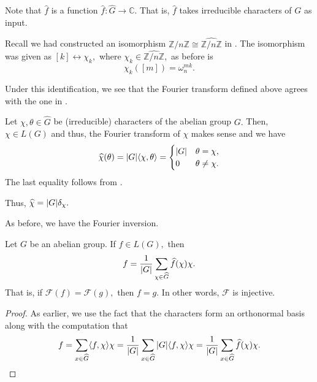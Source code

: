 Note that $\widehat{f}$ is a function $\widehat{f} : \widehat{G} \to \mathbb{C}.$ That is, $\widehat{f}$ takes irreducible characters of $G$ as input.

\begin{rem}
    Recall we had constructed an isomorphism $\mathbb{Z}/n\mathbb{Z} \cong \widehat{\mathbb{Z}/n\mathbb{Z}}$ in . The isomorphism was given as $[k] \leftrightarrow \chi_k,$ where $\chi_k \in \widehat{\mathbb{Z}/n\mathbb{Z}},$ as before is
    \begin{equation*} 
        \chi_k([m]) = \omega_n^{mk}.
    \end{equation*}

    Under this identification, we see that the Fourier transform defined above agrees with the one in .
\end{rem}

\begin{ex} \label{ex:fourtranschar}
    Let $\chi, \theta \in \widehat{G}$ be (irreducible) characters of the abelian group $G.$ Then, $\chi \in L(G)$ and thus, the Fourier transform of $\chi$ makes sense and we have
    \begin{equation*}
        \widehat{\chi}(\theta) = {\left\lvert G \right\lvert} \langle \chi, \theta\rangle = 
        \begin{cases}
            {\left\lvert G \right\lvert} & \theta = \chi, \\
            0 & \theta \neq \chi.
        \end{cases}
    \end{equation*}
    The last equality follows from .
    
    Thus, $\widehat{\chi} = {\left\lvert G \right\lvert} \delta_\chi.$
\end{ex}

As before, we have the Fourier inversion. 

\begin{thm} \label{thm:fourierinv}
    Let $G$ be an abelian group. If $f \in L(G),$ then
    \begin{equation*}
        f = \frac{1}{{\left\lvert G \right\lvert}}\sum_{\chi \in \widehat{G}} \widehat{f}(\chi)\chi.
    \end{equation*}
    That is, if $\mathcal{F}(f) = \mathcal{F}(g),$ then $f = g.$ In other words, $\mathcal{F}$ is injective.
\end{thm}
\begin{proof}
    As earlier, we use the fact that the characters form an orthonormal basis along with the computation that
    \begin{equation*}
        f = \sum_{x \in \widehat{G}}\langle f, \chi\rangle\chi = \frac{1}{{\left\lvert G \right\lvert}}\sum_{x \in \widehat{G}}{\left\lvert G \right\lvert}\langle f, \chi\rangle\chi = \frac{1}{{\left\lvert G \right\lvert}}\sum_{x \in \widehat{G}} \widehat{f}(\chi)\chi. \qedhere
    \end{equation*}
\end{proof}

